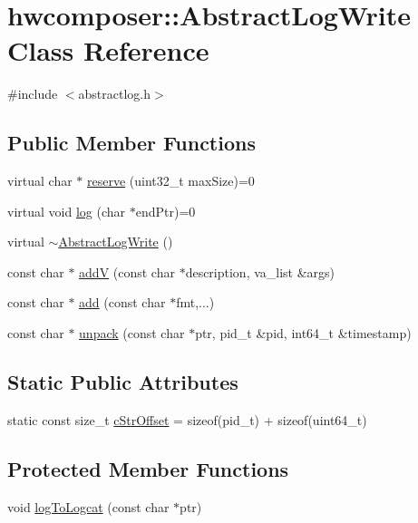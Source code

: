 \hypertarget{classhwcomposer_1_1AbstractLogWrite}{}\section{hwcomposer\+:\+:Abstract\+Log\+Write Class Reference}
\label{classhwcomposer_1_1AbstractLogWrite}


{\ttfamily \#include $<$abstractlog.\+h$>$}

\subsection*{Public Member Functions}
\begin{DoxyCompactItemize}
\item 
virtual char $\ast$ \mbox{\hyperlink{classhwcomposer_1_1AbstractLogWrite_a1e91aa0a8644b25d1a5631aa27c2e12a}{reserve}} (uint32\+\_\+t max\+Size)=0
\item 
virtual void \mbox{\hyperlink{classhwcomposer_1_1AbstractLogWrite_a48270085d3c27b1bf677ad0cd1e1e6f4}{log}} (char $\ast$end\+Ptr)=0
\item 
virtual \mbox{\hyperlink{classhwcomposer_1_1AbstractLogWrite_af4ffd5e02ff4ab0793240f277a977490}{$\sim$\+Abstract\+Log\+Write}} ()
\item 
const char $\ast$ \mbox{\hyperlink{classhwcomposer_1_1AbstractLogWrite_a71a35f2cc404fda44f1be588ba0704ea}{addV}} (const char $\ast$description, va\+\_\+list \&args)
\item 
const char $\ast$ \mbox{\hyperlink{classhwcomposer_1_1AbstractLogWrite_a20e581518ad33452f943f249baa1a9f8}{add}} (const char $\ast$fmt,...)
\item 
const char $\ast$ \mbox{\hyperlink{classhwcomposer_1_1AbstractLogWrite_a4888d603916411aed97cbab06cdabbad}{unpack}} (const char $\ast$ptr, pid\+\_\+t \&pid, int64\+\_\+t \&timestamp)
\end{DoxyCompactItemize}
\subsection*{Static Public Attributes}
\begin{DoxyCompactItemize}
\item 
static const size\+\_\+t \mbox{\hyperlink{classhwcomposer_1_1AbstractLogWrite_a926b1236104dd30fd5262cfd7f66fa79}{c\+Str\+Offset}} = sizeof(pid\+\_\+t) + sizeof(uint64\+\_\+t)
\end{DoxyCompactItemize}
\subsection*{Protected Member Functions}
\begin{DoxyCompactItemize}
\item 
void \mbox{\hyperlink{classhwcomposer_1_1AbstractLogWrite_a854cb2e7bfd9f4b5a32235b057e24a6f}{log\+To\+Logcat}} (const char $\ast$ptr)
\end{DoxyCompactItemize}


